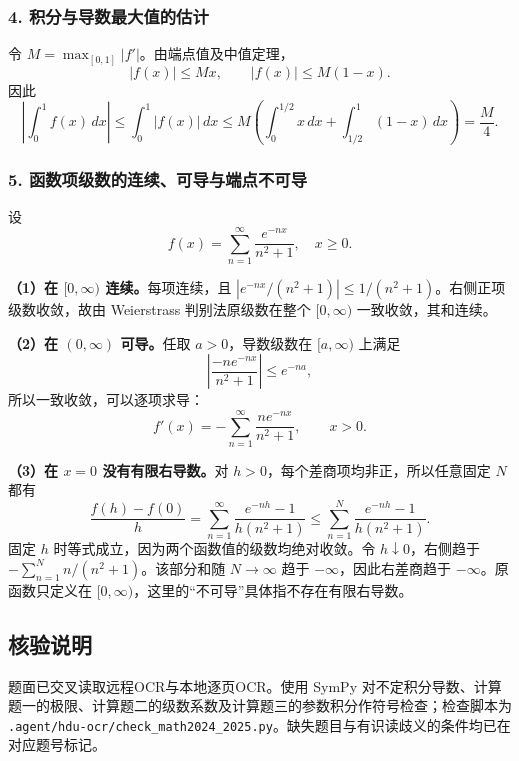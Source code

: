\documentclass[11pt,fontset=fandol]{ctexart}
\begin{document}
\subsubsection{4.
积分与导数最大值的估计}\label{ux79efux5206ux4e0eux5bfcux6570ux6700ux5927ux503cux7684ux4f30ux8ba1}

令 \(M=\max_{[0,1]}|f'|\)。由端点值及中值定理， \[
|f(x)|\le Mx,\qquad |f(x)|\le M(1-x).
\] 因此 \[
\left|\int_0^1f(x)\,dx\right|
\le\int_0^1|f(x)|\,dx
\le M\left(\int_0^{1/2}x\,dx+\int_{1/2}^1(1-x)\,dx\right)=\frac M4.
\]

\subsubsection{5.
函数项级数的连续、可导与端点不可导}\label{ux51fdux6570ux9879ux7ea7ux6570ux7684ux8fdeux7eedux53efux5bfcux4e0eux7aefux70b9ux4e0dux53efux5bfc}

设 \[
f(x)=\sum_{n=1}^\infty\frac{e^{-nx}}{n^2+1},\quad x\ge0.
\]

\textbf{（1）在 \([0,\infty)\) 连续。}每项连续，且
\(|e^{-nx}/(n^2+1)|\le1/(n^2+1)\)。右侧正项级数收敛，故由 Weierstrass
判别法原级数在整个 \([0,\infty)\) 一致收敛，其和连续。

\textbf{（2）在 \((0,\infty)\) 可导。}任取 \(a>0\)，导数级数在
\([a,\infty)\) 上满足 \[
\left|\frac{-ne^{-nx}}{n^2+1}\right|\le e^{-na},
\] 所以一致收敛，可以逐项求导： \[
f'(x)=-\sum_{n=1}^\infty\frac{ne^{-nx}}{n^2+1},\qquad x>0.
\]

\textbf{（3）在 \(x=0\) 没有有限右导数。}对
\(h>0\)，每个差商项均非正，所以任意固定 \(N\) 都有 \[
\frac{f(h)-f(0)}h
=\sum_{n=1}^\infty\frac{e^{-nh}-1}{h(n^2+1)}
\le\sum_{n=1}^N\frac{e^{-nh}-1}{h(n^2+1)}.
\] 固定 \(h\) 时等式成立，因为两个函数值的级数均绝对收敛。令
\(h\downarrow0\)，右侧趋于 \(-\sum_{n=1}^N n/(n^2+1)\)。该部分和随
\(N\to\infty\) 趋于 \(-\infty\)，因此右差商趋于
\(-\infty\)。原函数只定义在
\([0,\infty)\)，这里的``不可导''具体指不存在有限右导数。

\subsection{核验说明}\label{ux6838ux9a8cux8bf4ux660e}

题面已交叉读取远程OCR与本地逐页OCR。使用 SymPy
对不定积分导数、计算题一的极限、计算题二的级数系数及计算题三的参数积分作符号检查；检查脚本为
\texttt{.agent/hdu-ocr/check\_math2024\_2025.py}。缺失题目与有识读歧义的条件均已在对应题号标记。
\end{document}
